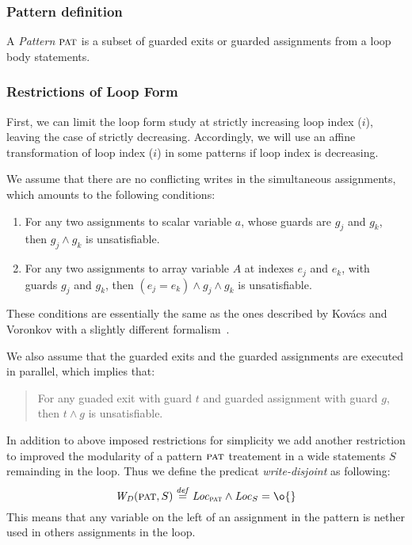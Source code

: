 \documentclass[a4paper,10pt]{article}
\newcommand{\idx}{\ensuremath{i}\xspace}
\newcommand{\symdef}{\ensuremath{\overset{\mathit{def}}{=}}}
\newcommand{\writedisjoint}[2]{\ensuremath{\mathit{W_D}(#1,#2)}\xspace}
\newcommand{\pat}{\ensuremath{\textsc{pat}}\xspace}
\begin{document}
\subsubsection*{Pattern definition}
A \emph{Pattern} \pat is a subset of guarded exits or guarded 
assignments from a loop body statements.

\subsubsection*{Restrictions of Loop Form}

First, we can limit the loop form study at strictly increasing loop index (\idx), 
leaving the case of strictly decreasing. Accordingly, we will use an affine 
transformation of loop index (\idx) in some patterns if loop index is decreasing.
   
\vspace{0.5cm}

We assume that there are no conflicting writes in the simultaneous assignments,
which amounts to the following conditions:

\begin{enumerate}
\item For any two assignments to scalar variable $a$, whose guards are $g_j$
  and $g_k$, then $g_j \land g_k$ is unsatisfiable.
\item For any two assignments to array variable $A$ at indexes $e_j$ and $e_k$,
  with guards $g_j$ and $g_k$, then $(e_j = e_k) \land g_j \land g_k$ is
  unsatisfiable.
\end{enumerate}

These conditions are essentially the same as the ones described by Kov\'acs and
Voronkov with a slightly different formalism~\cite{kovacs:2009:fli}.

\vspace{0.5cm}

We also assume that the guarded exits and the guarded assignments are executed in parallel,
which implies that:
\begin{quote}
  For any guaded exit with guard $t$ and guarded assignment with guard $g$, then 
  $t \land g $ is unsatisfiable.
\end{quote}

In addition to above imposed restrictions for simplicity we add  another restriction
to improved the modularity of a pattern \pat treatement in a wide statements $S$
remainding in the loop.
Thus we define the predicat \emph{write-disjoint} as following:
$$\writedisjoint{\pat}{S} \symdef \loc{\pat} \land \loc{S} = \o{}$$
This means that any variable on the left of an assignment in the pattern is 
nether used in others assignments in the loop.
\end{document}
